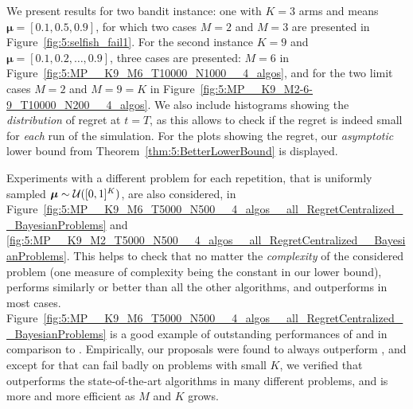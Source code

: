 %

We present results for two bandit instance: one with $K=3$ arms and means
$\boldsymbol{\mu} = [0.1, 0.5, 0.9]$, for which two cases $M=2$ and $M=3$ are presented in Figure~\ref{fig:5:selfish_fail1}. For the second instance $K=9$ and $\boldsymbol{\mu} = [0.1, 0.2, \dots, 0.9]$,
three cases are presented: $M=6$ in Figure~\ref{fig:5:MP__K9_M6_T10000_N1000__4_algos},
and for the two limit cases $M=2$ and $M=9=K$ in Figure~\ref{fig:5:MP__K9_M2-6-9_T10000_N200__4_algos}.
%
We also include histograms showing the \emph{distribution} of regret at $t=T$,
as this allows to check if the regret is indeed small for \emph{each} run of the simulation.
%
For the plots showing the regret, our \emph{asymptotic} lower bound from Theorem~\ref{thm:5:BetterLowerBound} is displayed.

Experiments with a different problem for each repetition,
that is uniformly sampled $\boldsymbol{\mu} \sim \mathcal{U}([0,1]^K)$,
are also considered, in Figure~\ref{fig:5:MP__K9_M6_T5000_N500__4_algos__all_RegretCentralized__BayesianProblems} and \ref{fig:5:MP__K9_M2_T5000_N500__4_algos__all_RegretCentralized__BayesianProblems}.
This helps to check that no matter the \emph{complexity} of the considered problem (one measure of complexity being the constant in our lower bound),
\MCTopM{} performs similarly or better than all the other algorithms,
and \Selfish{} outperforms \rhoRand{} in most cases.
Figure~\ref{fig:5:MP__K9_M6_T5000_N500__4_algos__all_RegretCentralized__BayesianProblems} is a good example
of outstanding performances of \MCTopM{} and \Selfish{} in comparison to \rhoRand{}.
%
Empirically, our proposals were found to always outperform \rhoRand{}, and except for \Selfish{} that can fail badly on problems with small $K$,
we verified that \MCTopM{} outperforms the state-of-the-art algorithms in many different problems, and is more and more efficient as $M$ and $K$ grows.



